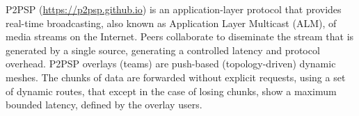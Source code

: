 P2PSP (\url{https://p2psp.github.io}) is an application-layer protocol
that provides real-time broadcasting, also known as Application Layer
Multicast (ALM), of media streams on the Internet. Peers collaborate
to diseminate the stream that is generated by a single source,
generating a controlled latency and protocol overhead. P2PSP overlays
(teams) are push-based (topology-driven) dynamic meshes. The chunks of
data are forwarded without explicit requests, using a set of dynamic
routes, that except in the case of losing chunks, show a maximum
bounded latency, defined by the overlay users.
